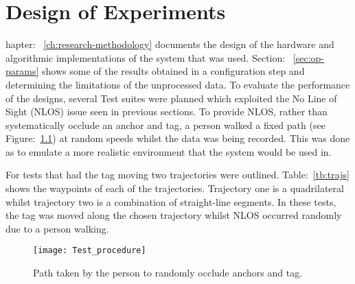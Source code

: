 \chapter{Design of Experiments}\label{ch:design-experiments}
hapter: ~\ref{ch:research-methodology} documents the design of the hardware and algorithmic implementations of the system that was used.
Section: ~\ref{sec:op-params} shows some of the results obtained in a configuration step and determining the limitations of the unprocessed data.
To evaluate the performance of the designs, several Test suites were planned which exploited the No Line of Sight (NLOS) issue seen in previous sections.
To provide NLOS, rather than systematically occlude an anchor and tag, a person walked a fixed path (see Figure:~\ref{fig:occlude}) at random speeds whilst the data was being recorded.
This was done as to emulate a more realistic environment that the system would be used in.

For tests that had the tag moving two trajectories were outlined.
Table:~\ref{tb:trajs} shows the waypoints of each of the trajectories.
Trajectory one is a quadrilateral whilst trajectory two is a combination of straight-line segments.
In these tests, the tag was moved along the chosen trajectory whilst NLOS occurred randomly due to a person walking.


\begin{figure}[ht!]
    \centering
    \texttt{[image: Test\_procedure]}
    \caption{Path taken by the person to randomly occlude anchors and tag.}
    \label{fig:occlude}
\end{figure}

